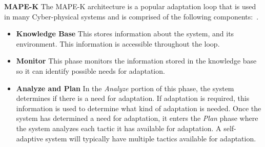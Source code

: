 \documentclass[11pt]{proposalnsf}
\newlength\q %
\begin{document}
\begin{sloppypar}
\vspace{3mm} \noindent \textbf{MAPE-K} The MAPE-K architecture is a popular adaptation loop that is used in many Cyber-physical systems and is comprised of the following components:~\cite{kephart2003vision}.






\begin{itemize}[noitemsep]

\item \textbf{Knowledge Base} This stores information about the system, and its environment. This information is accessible throughout the loop.



\item \textbf{Monitor} This phase monitors the information stored in the knowledge base so it can identify possible needs for adaptation. %

\item \textbf{Analyze and Plan}  In  the \textit{Analyze} portion of this phase, the system determines if there is a need for adaptation. If adaptation is required, this information is used to determine what kind of adaptation is needed. Once the system has determined a need for adaptation, it enters the \textit{Plan} phase where the system analyzes each tactic it has available for adaptation. A self-adaptive system will typically have multiple tactics available for adaptation.



\end{itemize}
\end{sloppypar}
\end{document}
